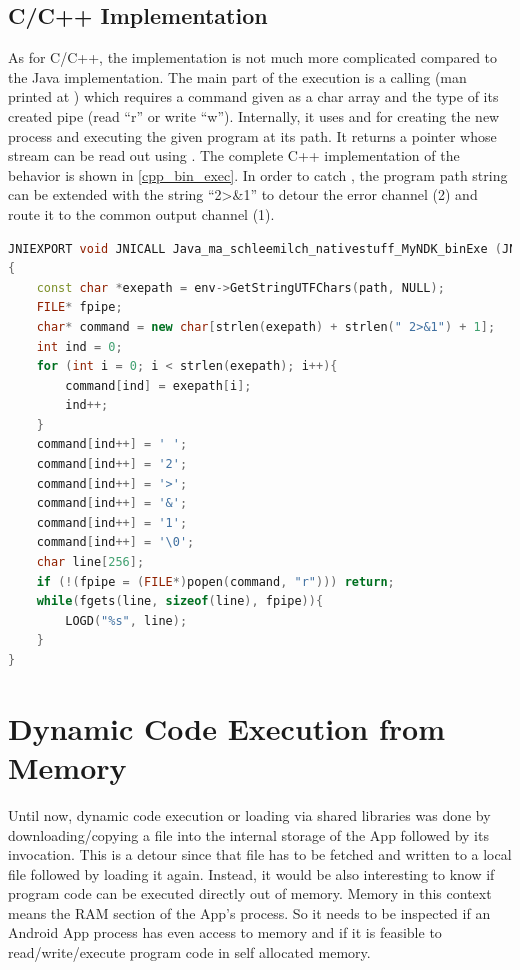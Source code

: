 \subsection{C/C++ Implementation}\label{dyn_bin_c}
As for C/C++, the implementation is not much more complicated compared to the Java implementation.
The main part of the execution is a calling 
(man printed at \parencite{popen}) which requires a command
given as a char array and the type of its created pipe (read ``r'' or write ``w''). Internally, it uses  and  for creating the new
process and executing the given program at its path. It returns a  pointer
whose stream can be read out using . The complete C++ implementation
of the behavior is shown in \autoref{cpp_bin_exec}. In order to catch ,
the program path string can be extended with the string ``2>\&1'' to detour the error
channel (2) and route it to the common output channel  (1).
\begin{lstlisting}[language=C++, caption=C++ Native Exec(), label=cpp_bin_exec]
JNIEXPORT void JNICALL Java_ma_schleemilch_nativestuff_MyNDK_binExe (JNIEnv *env, object obj, jstring path)
{
	const char *exepath = env->GetStringUTFChars(path, NULL);
	FILE* fpipe;
	char* command = new char[strlen(exepath) + strlen(" 2>&1") + 1];
	int ind = 0;
	for (int i = 0; i < strlen(exepath); i++){
		command[ind] = exepath[i];
		ind++;
	}
	command[ind++] = ' ';
	command[ind++] = '2';
	command[ind++] = '>';
	command[ind++] = '&';
	command[ind++] = '1';
	command[ind++] = '\0';
	char line[256];
	if (!(fpipe = (FILE*)popen(command, "r"))) return;
	while(fgets(line, sizeof(line), fpipe)){
		LOGD("%s", line);
	}
}
\end{lstlisting}

\section{Dynamic Code Execution from Memory}\label{section:dyn_code_memory}

Until now, dynamic code execution or loading via shared libraries was done
by downloading/copying a file into the internal storage of the App followed
by its invocation. This is a detour since that file has to be fetched and written to a local file followed by loading it again.
Instead, it would be also interesting to know if program code can be executed directly
out of memory. Memory in this context means the RAM section of the App's process.
So it needs to be inspected if an Android App process has even access
to memory and if it is feasible to read/write/execute program code in self
allocated memory.

